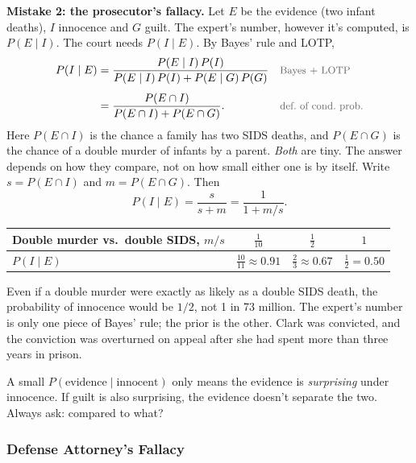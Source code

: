 \begin{solution}
\textbf{Mistake 2: the prosecutor's fallacy.} Let $E$ be the evidence (two infant deaths), $I$ innocence and $G$ guilt. The expert's number, however it's computed, is $P(E \mid I)$. The court needs $P(I \mid E)$. By Bayes' rule and LOTP,
\begin{align*}
P(I \mid E)
  &= \frac{P(E \mid I)\,P(I)}{P(E \mid I)\,P(I) + P(E \mid G)\,P(G)}
  && \by{Bayes + LOTP} \\[0.4em]
  &= \frac{P(E \cap I)}{P(E \cap I) + P(E \cap G)}.
  && \by{def.\ of cond.\ prob.}
\end{align*}
Here $P(E \cap I)$ is the chance a family has two SIDS deaths, and $P(E \cap G)$ is the chance of a double murder of infants by a parent. \emph{Both} are tiny. The answer depends on how they compare, not on how small either one is by itself. Write $s = P(E \cap I)$ and $m = P(E \cap G)$. Then
\[
P(I \mid E) = \frac{s}{s + m} = \frac{1}{1 + m/s}.
\]
\begin{center}
\begin{tabular}{@{}lccc@{}}
\toprule
Double murder vs.\ double SIDS, $m/s$ & $\tfrac{1}{10}$ & $\tfrac{1}{2}$ & $1$ \\
\midrule
$P(I \mid E)$ & $\tfrac{10}{11} \approx 0.91$ & $\tfrac{2}{3} \approx 0.67$ & $\tfrac{1}{2} = 0.50$ \\
\bottomrule
\end{tabular}
\end{center}
Even if a double murder were exactly as likely as a double SIDS death, the probability of innocence would be $1/2$, not 1 in 73 million. The expert's number is only one piece of Bayes' rule; the prior is the other. Clark was convicted, and the conviction was overturned on appeal after she had spent more than three years in prison.
\end{solution}

\begin{pitfall}
A small $P(\text{evidence} \mid \text{innocent})$ only means the evidence is \emph{surprising} under innocence. If guilt is also surprising, the evidence doesn't separate the two. Always ask: compared to what?
\end{pitfall}

\subsubsection{Defense Attorney's Fallacy}

